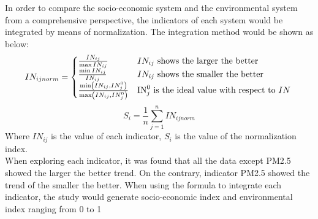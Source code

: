 In order to compare the socio-economic system and the environmental system from a comprehensive perspective, the indicators of each system would be integrated by means of normalization. The integration method would be shown as below:\\

\begin{equation}
IN_{i j norm}= \begin{cases}\frac{IN_{i j}}{\max IN_{i j}} & IN_{i j} \text { shows the larger the better } \\ \frac{\min IN_{i j}}{IN_{i j}} & IN_{i j} \text { shows the smaller the better } \\ \frac{\min \left(IN_{i j}, IN_{j}^{0}\right)}{\max \left(IN_{i j}, IN_{j}^{0}\right)} & \mathrm{IN}_{j}^{0} \text { is the ideal value with respect to } IN\end{cases}\\
\end{equation}
\begin{equation}
S_{i}=\frac{1}{n} \sum_{j=1}^{n} IN_{i j norm}
\end{equation}
Where $IN_{i j}$ is the value of each indicator, $S_{i}$ is the value of the normalization index.\\

When exploring each indicator, it was found that all the data except PM2.5 showed the larger the better trend. On the contrary, indicator PM2.5 showed the trend of the smaller the better. When using the formula to integrate each indicator, the study would generate socio-economic index and environmental index ranging from 0 to 1\\
